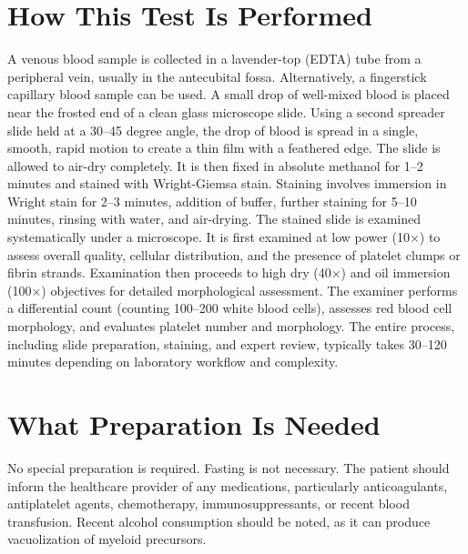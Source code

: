 \section*{How This Test Is Performed}
A venous blood sample is collected in a lavender-top (EDTA) tube from a peripheral vein, usually in the antecubital fossa. Alternatively, a fingerstick capillary blood sample can be used. A small drop of well-mixed blood is placed near the frosted end of a clean glass microscope slide. Using a second spreader slide held at a 30--45 degree angle, the drop of blood is spread in a single, smooth, rapid motion to create a thin film with a feathered edge. The slide is allowed to air-dry completely. It is then fixed in absolute methanol for 1--2 minutes and stained with Wright-Giemsa stain. Staining involves immersion in Wright stain for 2--3 minutes, addition of buffer, further staining for 5--10 minutes, rinsing with water, and air-drying. The stained slide is examined systematically under a microscope. It is first examined at low power (10$\times$) to assess overall quality, cellular distribution, and the presence of platelet clumps or fibrin strands. Examination then proceeds to high dry (40$\times$) and oil immersion (100$\times$) objectives for detailed morphological assessment. The examiner performs a differential count (counting 100--200 white blood cells), assesses red blood cell morphology, and evaluates platelet number and morphology. The entire process, including slide preparation, staining, and expert review, typically takes 30--120 minutes depending on laboratory workflow and complexity.

\section*{What Preparation Is Needed}
No special preparation is required. Fasting is not necessary. The patient should inform the healthcare provider of any medications, particularly anticoagulants, antiplatelet agents, chemotherapy, immunosuppressants, or recent blood transfusion. Recent alcohol consumption should be noted, as it can produce vacuolization of myeloid precursors.

